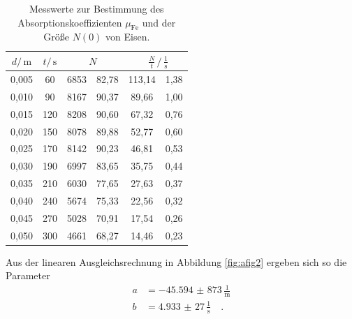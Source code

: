 \begin{table}[h]
    \centering
    \caption{Messwerte zur Bestimmung des Absorptionskoeffizienten $\mu_\text{Fe}$ und der Größe $N\left(0\right)$ von Eisen.}
    \label{tab:atab3}
    \begin{tabular}{S[table-format=1.3] S[table-format=3.0] S[table-format=4.0] @{${}\pm{}$} S[table-format=2.2] S[table-format=3.2] @{${}\pm{}$} S[table-format=1.2]}
        \toprule
        {$d / \, \si{\meter}$} & {$t / \, \si{\second}$} &  &  \\
        ,005 & 60  & 6853 & 82,78 & 113,14 & 1,38 \\
        0,010 & 90  & 8167 & 90,37 & 89,66  & 1,00 \\
        0,015 & 120 & 8208 & 90,60 & 67,32  & 0,76 \\
        0,020 & 150 & 8078 & 89,88 & 52,77  & 0,60 \\
        0,025 & 170 & 8142 & 90,23 & 46,81  & 0,53 \\
        0,030 & 190 & 6997 & 83,65 & 35,75  & 0,44 \\
        0,035 & 210 & 6030 & 77,65 & 27,63  & 0,37 \\
        0,040 & 240 & 5674 & 75,33 & 22,56  & 0,32 \\
        0,045 & 270 & 5028 & 70,91 & 17,54  & 0,26 \\
        0,050 & 300 & 4661 & 68,27 & 14,46  & 0,23 \\
        \bottomrule
    \end{tabular}
\end{table}
\FloatBarrier
\noindent
Aus der linearen Ausgleichsrechnung in Abbildung \ref{fig:afig2} ergeben sich so die Parameter 
\begin{align*}
    a &= \num{-45,594(873)} \, \frac{1}{\si{\meter}}\\
    b &= \num{4,933(27)} \, \frac{1}{\si{\second}} \quad .
\end{align*}
\FloatBarrier

